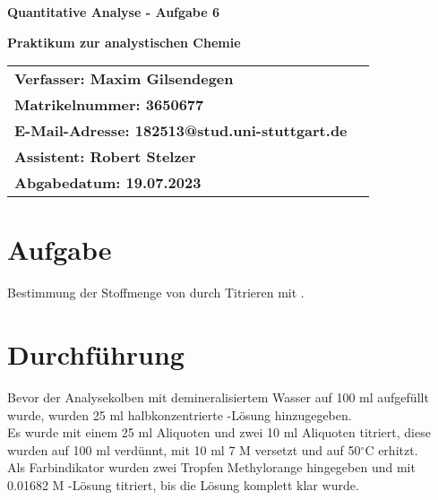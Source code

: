 \documentclass[12pt]{scrartcl} %
\newcommand{\celsius}{^{\circ}\mathrm{C}} %
\begin{document}
\begin{titlepage}
\begin{center}
\vspace*{2cm}
\begin{LARGE}
\vspace*{1cm}
\textbf{\textsf{Quantitative Analyse - Aufgabe 6\\}}
\end{LARGE}
\vspace*{1cm}
\textbf{\textsf{Praktikum zur analystischen Chemie}}\\
\vspace*{1.5cm}
\begin{table}[H]
\sffamily
\hspace*{3cm}\begin{tabular}{>{\bfseries}l>{\bfseries}l}
Verfasser: Maxim Gilsendegen\\
Matrikelnummer: 3650677\\
E-Mail-Adresse: 182513@stud.uni-stuttgart.de\\
Assistent: Robert Stelzer\\
Abgabedatum: 19.07.2023\\
\end{tabular}
\end{table}
\end{center}
\end{titlepage}
\renewcommand{\thepage}{\Roman{page}}\setcounter{page}{1}
\tableofcontents %
\newpage
\renewcommand{\thepage}{\arabic{page}}\setcounter{page}{1}

\section{Aufgabe}
Bestimmung der Stoffmenge von  durch Titrieren mit .\\

\section{Durchführung}
Bevor der Analysekolben mit demineralisiertem Wasser auf 100 ml aufgefüllt wurde, wurden 25 ml halbkonzentrierte -Lösung hinzugegeben.\\
Es wurde mit einem 25 ml Aliquoten und zwei 10 ml Aliquoten titriert, diese wurden auf 100 ml verdünnt, mit 10 ml 7 M  versetzt und auf 50$\celsius$ erhitzt.\\
Als Farbindikator wurden zwei Tropfen Methylorange hingegeben und mit 0.01682 M -Lösung titriert, bis die Lösung komplett klar wurde.
\end{document}
